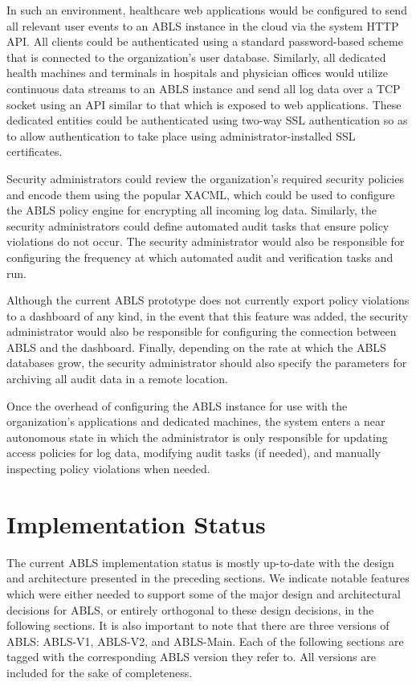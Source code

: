 \documentclass{sig-alternate}
\begin{document}
In such an environment, healthcare web applications would be configured to send all relevant user events to an ABLS 
instance in the cloud via the system HTTP API. All clients could be authenticated using a standard password-based 
scheme that is connected to the organization's user database. Similarly, all dedicated health machines and terminals in 
hospitals and physician offices would utilize continuous 
data streams to an ABLS instance and send all log data over a TCP socket using an API similar to that which is exposed to
web applications. These dedicated entities could be authenticated using two-way SSL authentication so 
as to allow authentication to take place using administrator-installed SSL certificates.

Security administrators could review the organization's required security policies and encode them using the popular 
XACML, which could be used to configure the ABLS policy engine for encrypting all incoming log data.
Similarly, the security administrators could define automated audit tasks that ensure policy violations do not occur. The 
security administrator would also be responsible for configuring the frequency at which automated audit and verification 
tasks and run. 

Although the current ABLS prototype does not currently export policy violations to a dashboard of any kind, in the event that 
this feature was added, the security administrator would also be responsible for configuring the connection between ABLS 
and the dashboard. Finally, depending on the rate at which the ABLS databases grow, the security administrator should 
also specify the parameters for archiving all audit data in a remote location. 

Once the overhead of configuring the ABLS instance for use with the organization's applications and dedicated machines,
the system enters a near autonomous state in which the administrator is only responsible for updating access policies 
for log data, modifying audit tasks (if needed), and manually inspecting policy violations when needed.

\section{Implementation Status}
The current ABLS implementation status is mostly up-to-date with the design and architecture presented 
in the preceding sections. We indicate notable features which were either needed to support some of the major design 
and architectural decisions for ABLS, or entirely orthogonal to these design decisions, in the following sections. It is
also important to note that there are three versions of ABLS: ABLS-V1, ABLS-V2, and ABLS-Main. Each of the following
sections are tagged with the corresponding ABLS version they refer to. All versions are included for the sake of 
completeness.
\end{document}
